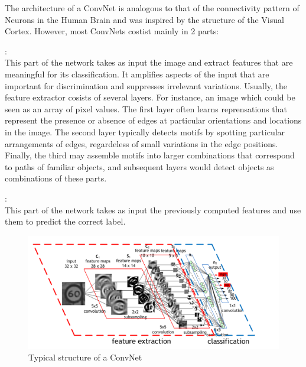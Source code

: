 \documentclass{report}
\begin{document}
The architecture of a ConvNet is analogous to that of the connectivity pattern of Neurons in the Human Brain and was inspired by the
structure of the Visual Cortex. However, most ConvNets costist mainly in 2 parts:
\begin{description}[font=$\bullet$\scshape\bfseries]
\item [ Feature extractor] : \\
  This part of the network takes as input the image and extract features that are meaningful for its classification. It amplifies aspects
  of the input that are important for discrimination and suppresses irrelevant variations. Usually, the feature extractor cosists of
  several layers. For instance, an image which could be seen as an array of pixel values. The first layer often learns reprensations
  that represent the presence or absence of edges at particular orientations and locations in the image. The second layer typically
  detects motifs by spotting particular arrangements of edges, regardeless of small variations in the edge positions. Finally, the third
  may assemble motifs into larger combinations that correspond to paths of familiar objects, and subsequent layers would detect objects
  as combinations of these parts.
  
\item [ Classifier ] : \\
  This part of the network takes as input the previously computed features and use them to predict the correct label.
\end{description}

\begin{figure}[h]
  \centering
  \includegraphics[scale=0.7]{convolutional_neural_network_structure}
  \caption{Typical structure of a ConvNet}
\end{figure}
\end{document}
